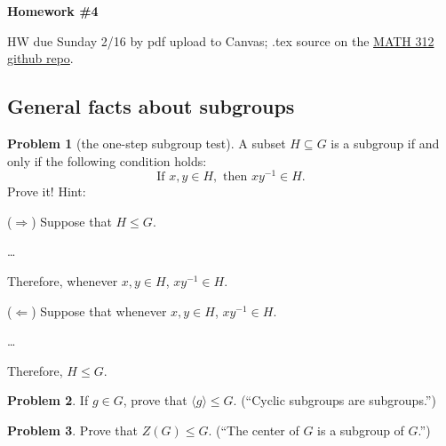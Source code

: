 \documentclass[12pt]{article}
\theoremstyle{definition} %
\newtheorem{problem}{Problem}
\newcommand{\Alert}[1]{\textcolor{xRed}{#1}}
\newcommand\inv{^{-1}} %
\def\<{\langle}
\def\>{\rangle}
\renewcommand{\section}[1]{\begin{center} \textbf{#1} \\\end{center}}
\begin{document}
\section{Homework \#4} %

HW due Sunday 2/16 by pdf upload to Canvas; .tex source on the \href{https://github.com/rhinopotamus/math312}{MATH 312 github repo}.


\subsection*{General facts about subgroups}

\begin{problem}[the one-step subgroup test]\label{onestep}
    A subset $H\subseteq G$ is a subgroup \Alert{if and only if} the following condition holds:
    \begin{equation}
        \text{If } x, y \in H, \text{ then } xy^{-1}\in H.
    \end{equation}
    Prove it! Hint: 
    \begin{multicols}{2}
        ($\Rightarrow$) Suppose that $H\leq G$.

        \ldots

        Therefore, whenever $x, y \in H$, $xy\inv\in H$.

        ($\Leftarrow$) Suppose that whenever $x, y \in H$, $xy\inv\in H$.

        \ldots

        Therefore, $H \leq G$.
    \end{multicols}
\end{problem}

\begin{problem}
    If $g\in G$, prove that $\<g\> \leq G$. (``Cyclic subgroups are subgroups.'')
\end{problem}

\begin{problem}
    Prove that $Z(G) \leq G$. (``The center of $G$ is a subgroup of $G$.'')
\end{problem}
\end{document}
